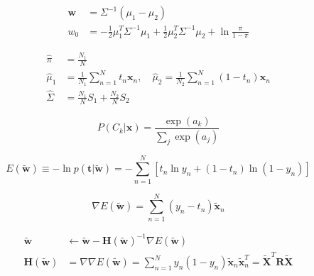 \documentclass{article}
\begin{document}
\begin{equation}
    \begin{aligned}
        \mathbf{w} &= \Sigma^{-1}(\mu_1 - \mu_2) \\
        w_0 &= -\frac{1}{2} \mu_1^T \Sigma^{-1} \mu_1 + \frac{1}{2} \mu_2^T \Sigma^{-1} \mu_2 + \ln \frac{\pi}{1 - \pi}
    \end{aligned}
\end{equation}

\begin{equation}
    \begin{aligned}
        \hat{\pi} &= \frac{N_1}{N} \\
        \hat{\mu}_1 &= \frac{1}{N_1} \sum_{n=1}^N t_n \mathbf{x}_n, \quad \hat{\mu}_2 = \frac{1}{N_2} \sum_{n=1}^N (1 - t_n) \mathbf{x}_n \\
        \hat{\Sigma} &= \frac{N_1}{N} S_1 + \frac{N_2}{N} S_2
    \end{aligned}
\end{equation}

\begin{equation}
    P(C_k | \mathbf{x}) = \frac{\exp(a_k)}{\sum_j \exp(a_j)}
\end{equation}

\begin{equation}
    E(\tilde{\mathbf{w}}) \equiv - \ln p(\mathbf{t} | \tilde{\mathbf{w}}) = - \sum_{n=1}^N[t_n \ln y_n + (1 - t_n) \ln(1 - y_n)]
\end{equation}

\begin{equation}
    \nabla E(\tilde{\mathbf{w}}) = \sum_{n=1}^N (y_n - t_n) \tilde{\mathbf{x}}_n
\end{equation}

\begin{equation}
    \begin{aligned}
        \tilde{\mathbf{w}} &\leftarrow \tilde{\mathbf{w}} - \mathbf{H}(\tilde{\mathbf{w}})^{-1} \nabla E(\tilde{\mathbf{w}}) \\
        \mathbf{H}(\tilde{\mathbf{w}}) &= \nabla \nabla E(\tilde{\mathbf{w}}) = \sum_{n=1}^N y_n (1 - y_n) \tilde{\mathbf{x}}_n \tilde{\mathbf{x}}_n^T = \tilde{\mathbf{X}}^T \mathbf{R} \tilde{\mathbf{X}}
    \end{aligned}
\end{equation}
\end{document}
